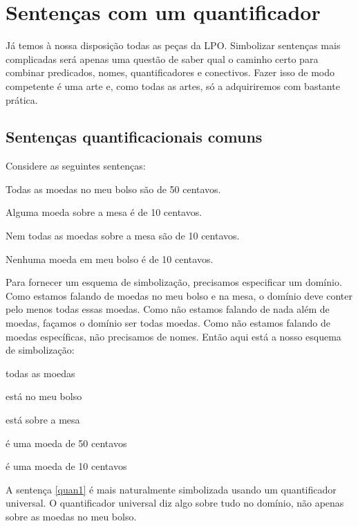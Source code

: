 \chapter{Sentenças com um quantificador}
\label{s:MoreMonadic}

Já temos à nossa disposição todas as peças da LPO.
Simbolizar sentenças mais complicadas será apenas uma questão de saber qual o caminho certo para combinar predicados, nomes, quantificadores e conectivos. Fazer isso de modo competente é uma arte e, como todas as artes,  só a adquiriremos com bastante prática.


\section{Sentenças quantificacionais comuns}
Considere as seguintes sentenças:
	\begin{earg}
		\item[\ex{quan1}] Todas as moedas no meu bolso são de 50 centavos.
		\item[\ex{quan2}] Alguma moeda sobre a mesa é de 10 centavos.
		\item[\ex{quan3}] Nem todas as moedas sobre a mesa são de 10 centavos.
		\item[\ex{quan4}] Nenhuma moeda em meu bolso é de 10 centavos.
	\end{earg}
Para fornecer um esquema de simbolização, precisamos especificar um domínio.
Como estamos falando de moedas no meu bolso e na mesa, o domínio deve conter pelo menos todas essas moedas.
Como não estamos falando de nada além de moedas, façamos o domínio ser todas moedas.
Como não estamos falando de moedas específicas, não precisamos de nomes.
Então aqui está a nosso esquema de simbolização:
	\begin{center}
	\begin{ekey}
		\item[\text{domínio}] todas as moedas
		\item[\atom{B}{x}]  está no meu bolso
		\item[\atom{M}{x}]  está sobre a mesa
		\item[\atom{C}{x}]  é uma moeda de 50 centavos
		\item[\atom{D}{x}]  é uma moeda de 10 centavos
	\end{ekey}
	\end{center}
A sentença \ref{quan1} é mais naturalmente simbolizada usando um quantificador universal.
O quantificador universal diz algo sobre tudo no domínio, não apenas sobre as moedas no meu bolso.
